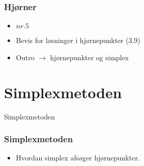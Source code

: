 \begin{frame}
\frametitle{Hjørner}
\begin{itemize}
\item \textbf{$nr. 5$}
\item Bevis for løsninger i hjørnepunkter (3.9)
\item Outro $\rightarrow$ hjørnepunkter og simplex
\end{itemize}
\end{frame}

\section{Simplexmetoden}
\begin{frame}
\centering
\Huge
Simplexmetoden
\end{frame}
%
\begin{frame}
\frametitle{Simplexmetoden}
\begin{itemize}
\item Hvordan simplex afsøger hjørnepunkter.
\end{itemize}
\end{frame}